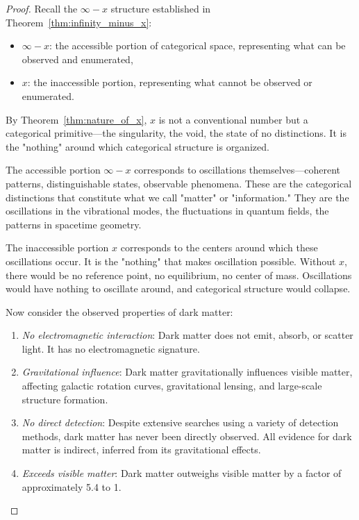 \documentclass[12pt,a4paper]{article}
\theoremstyle{definition}
\theoremstyle{remark}
\begin{document}
\begin{proof}
Recall the $\infty - x$ structure established in Theorem~\ref{thm:infinity_minus_x}:
\begin{itemize}
    \item $\infty - x$: the accessible portion of categorical space, representing what can be observed and enumerated,
    \item $x$: the inaccessible portion, representing what cannot be observed or enumerated.
\end{itemize}

By Theorem~\ref{thm:nature_of_x}, $x$ is not a conventional number but a categorical primitive—the singularity, the void, the state of no distinctions. It is the "nothing" around which categorical structure is organized.

The accessible portion $\infty - x$ corresponds to oscillations themselves—coherent patterns, distinguishable states, observable phenomena. These are the categorical distinctions that constitute what we call "matter" or "information." They are the oscillations in the vibrational modes, the fluctuations in quantum fields, the patterns in spacetime geometry.

The inaccessible portion $x$ corresponds to the centers around which these oscillations occur. It is the "nothing" that makes oscillation possible. Without $x$, there would be no reference point, no equilibrium, no center of mass. Oscillations would have nothing to oscillate around, and categorical structure would collapse.

Now consider the observed properties of dark matter:
\begin{enumerate}
    \item \emph{No electromagnetic interaction}: Dark matter does not emit, absorb, or scatter light. It has no electromagnetic signature.
    \item \emph{Gravitational influence}: Dark matter gravitationally influences visible matter, affecting galactic rotation curves, gravitational lensing, and large-scale structure formation.
    \item \emph{No direct detection}: Despite extensive searches using a variety of detection methods, dark matter has never been directly observed. All evidence for dark matter is indirect, inferred from its gravitational effects.
    \item \emph{Exceeds visible matter}: Dark matter outweighs visible matter by a factor of approximately 5.4 to 1.
\end{enumerate}


\end{proof}
\end{document}
